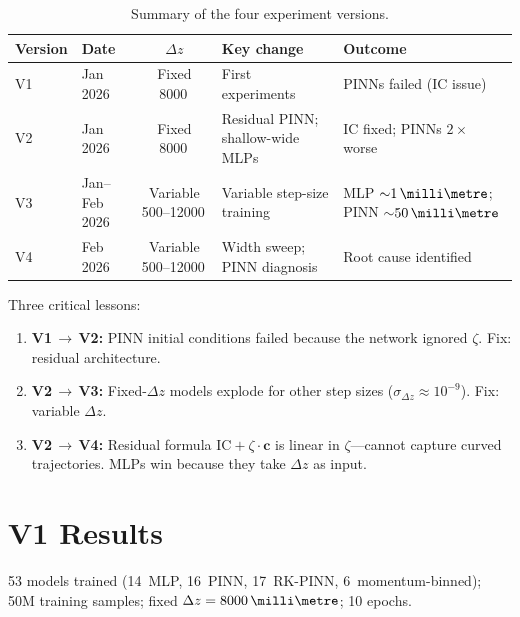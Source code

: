 \documentclass[11pt,a4paper]{article}
\newcommand{\SI}[2]{#1\,\text{#2}}
\newcommand{\zfrac}{\zeta}
\newcommand{\dz}{\Delta z}
\newcommand{\vc}{\mathbf{c}}
\newcommand{\IC}{\mathrm{IC}}
\begin{document}
\begin{table}[H]
\centering
\caption{Summary of the four experiment versions.}
\label{tab:timeline}
\begin{tabular}{@{} l l c l l @{}}
\toprule
Version & Date & $\dz$ & Key change & Outcome \\
\midrule
V1 & Jan 2026 & Fixed \SI{8000}{\milli\metre}
   & First experiments
   & PINNs failed (IC issue) \\
V2 & Jan 2026 & Fixed \SI{8000}{\milli\metre}
   & Residual PINN; shallow-wide MLPs
   & IC fixed; PINNs $2\times$ worse \\
V3 & Jan--Feb 2026 & Variable 500--\SI{12000}{\milli\metre}
   & Variable step-size training
   & MLP ${\sim}\SI{1}{\milli\metre}$; PINN ${\sim}\SI{50}{\milli\metre}$ \\
V4 & Feb 2026 & Variable 500--\SI{12000}{\milli\metre}
   & Width sweep; PINN diagnosis
   & Root cause identified \\
\bottomrule
\end{tabular}
\end{table}

Three critical lessons:
\begin{enumerate}[nosep]
  \item \textbf{V1\,$\to$\,V2:} PINN initial conditions failed because
        the network ignored $\zfrac$.  Fix: residual architecture.
  \item \textbf{V2\,$\to$\,V3:} Fixed-$\dz$ models explode for other step
        sizes ($\sigma_{\dz}\approx10^{-9}$).  Fix: variable $\dz$.
  \item \textbf{V2\,$\to$\,V4:} Residual formula
        $\IC+\zfrac\cdot\vc$ is linear in $\zfrac$---cannot capture
        curved trajectories.  MLPs win because they take $\dz$ as input.
\end{enumerate}

\section{V1 Results}\label{sec:v1}

53 models trained (14~MLP, 16~PINN, 17~RK-PINN, 6~momentum-binned);
50M training samples; fixed $\dz=\SI{8000}{\milli\metre}$; 10 epochs.
\end{document}
